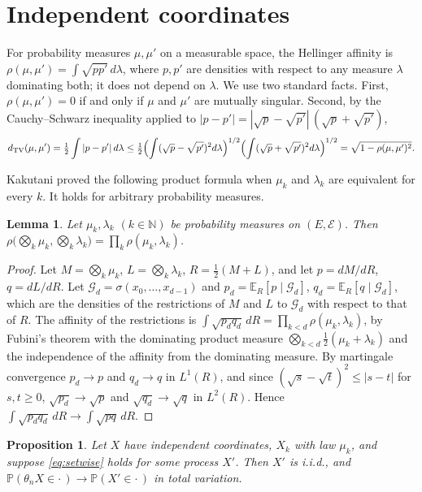 \documentclass[11pt]{amsart}
\newtheorem{proposition}[theorem]{Proposition}
\newtheorem{lemma}[theorem]{Lemma}
\theoremstyle{definition}
\theoremstyle{remark}
\newcommand{\N}{\mathbb N}
\newcommand{\E}{\mathbb E}
\newcommand{\Prob}{\mathbb P}
\newcommand{\cE}{\mathcal E}
\newcommand{\dtv}{d_{\mathrm{TV}}}
\begin{document}
\section{Independent coordinates}\label{sec:independent}

For probability measures $\mu,\mu'$ on a measurable space, the Hellinger affinity is
$\rho(\mu,\mu')=\int\sqrt{pp'}\,d\lambda$, where $p,p'$ are densities with respect to any measure $\lambda$ dominating
both; it does not depend on $\lambda$. We use two standard facts. First, $\rho(\mu,\mu')=0$ if and only if $\mu$ and
$\mu'$ are mutually singular. Second, by the Cauchy--Schwarz inequality applied to
$|p-p'|=|\sqrt p-\sqrt{p'}|\,(\sqrt p+\sqrt{p'})$,
\begin{equation}\label{eq:lecam}
\dtv(\mu,\mu')=\tfrac12\int|p-p'|\,d\lambda\le\tfrac12\Bigl(\int(\sqrt p-\sqrt{p'})^2d\lambda\Bigr)^{1/2}
\Bigl(\int(\sqrt p+\sqrt{p'})^2d\lambda\Bigr)^{1/2}=\sqrt{1-\rho(\mu,\mu')^2}.
\end{equation}

Kakutani \cite{Kak48} proved the following product formula when $\mu_k$ and $\lambda_k$ are equivalent for every
$k$. It holds for arbitrary probability measures.

\begin{lemma}\label{lem:kakutani}
Let $\mu_k,\lambda_k$ $(k\in\N)$ be probability measures on $(E,\cE)$. Then
$\rho\bigl(\bigotimes_k\mu_k,\bigotimes_k\lambda_k\bigr)=\prod_k\rho(\mu_k,\lambda_k)$.
\end{lemma}

\begin{proof}
Let $M=\bigotimes_k\mu_k$, $L=\bigotimes_k\lambda_k$, $R=\frac12(M+L)$, and let $p=dM/dR$, $q=dL/dR$. Let $\mathcal
G_d=\sigma(x_0,\dots,x_{d-1})$ and $p_d=\E_R[p\mid\mathcal G_d]$, $q_d=\E_R[q\mid\mathcal G_d]$, which are the densities
of the restrictions of $M$ and $L$ to $\mathcal G_d$ with respect to that of $R$. The affinity of the restrictions is
$\int\sqrt{p_dq_d}\,dR=\prod_{k<d}\rho(\mu_k,\lambda_k)$, by Fubini's theorem with the dominating product measure
$\bigotimes_{k<d}\frac12(\mu_k+\lambda_k)$ and the independence of the affinity from the dominating measure. By
martingale convergence $p_d\to p$ and $q_d\to q$ in $L^1(R)$, and since $(\sqrt s-\sqrt t)^2\le|s-t|$ for $s,t\ge0$,
$\sqrt{p_d}\to\sqrt p$ and $\sqrt{q_d}\to\sqrt q$ in $L^2(R)$. Hence $\int\sqrt{p_dq_d}\,dR\to\int\sqrt{pq}\,dR$.
\end{proof}

\begin{proposition}\label{prop:independent}
Let $X$ have independent coordinates, $X_k$ with law $\mu_k$, and suppose \eqref{eq:setwise} holds for some process
$X'$. Then $X'$ is i.i.d., and $\Prob(\theta_nX\in\cdot\,)\to\Prob(X'\in\cdot\,)$ in total variation.
\end{proposition}
\end{document}
